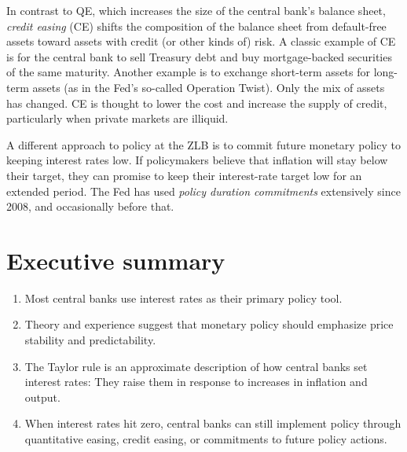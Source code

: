 In contrast to QE, which increases the size of the central bank's 
balance sheet, 
{\it credit easing\/} (CE) shifts the composition of the balance sheet
from default-free assets toward assets with credit (or other kinds of) risk.
A classic example of CE is for the central bank  to sell Treasury debt
and buy mortgage-backed securities of the same maturity. Another example
is to exchange short-term assets for long-term assets (as in the Fed's
so-called Operation Twist).
Only the mix of assets has changed.
CE is thought to lower the cost and increase the supply of credit,
particularly when private markets are illiquid.

A different approach to policy at the ZLB is to commit future monetary
policy to keeping interest rates low.
If policymakers believe that inflation will stay below their target,
they can promise to keep their interest-rate target low
for an extended period.
The Fed has used {\it   policy duration commitments\/}  
extensively since 2008, and occasionally before that.

\section*{Executive summary}

\begin{enumerate}
\item Most central banks use interest rates as their primary policy tool.

\item Theory and experience suggest that monetary policy
should emphasize price stability and predictability.

\item The Taylor rule is an approximate description of how
central banks set interest rates: They raise them in response to
increases in inflation and output.

\item When interest rates hit zero, central banks can still implement
policy through quantitative easing, credit easing, or
commitments to future policy actions.
\end{enumerate}


